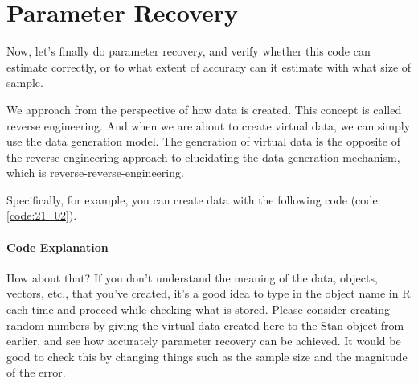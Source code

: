 \documentclass{ltjsbook}
\begin{document}
\section{Parameter Recovery}
Now, let's finally do parameter recovery, and verify whether this code can estimate correctly, or to what extent of accuracy can it estimate with what size of sample.

We approach from the perspective of how data is created. This concept is called reverse engineering. And when we are about to create virtual data, we can simply use the data generation model. The generation of virtual data is the opposite of the reverse engineering approach to elucidating the data generation mechanism, which is reverse-reverse-engineering.

Specifically, for example, you can create data with the following code (code:\ref{code:21_02}).

\paragraph{Code Explanation}


How about that? If you don't understand the meaning of the data, objects, vectors, etc., that you've created, it's a good idea to type in the object name in R each time and proceed while checking what is stored.
Please consider creating random numbers by giving the virtual data created here to the Stan object from earlier, and see how accurately parameter recovery can be achieved. It would be good to check this by changing things such as the sample size and the magnitude of the error.
\end{document}
